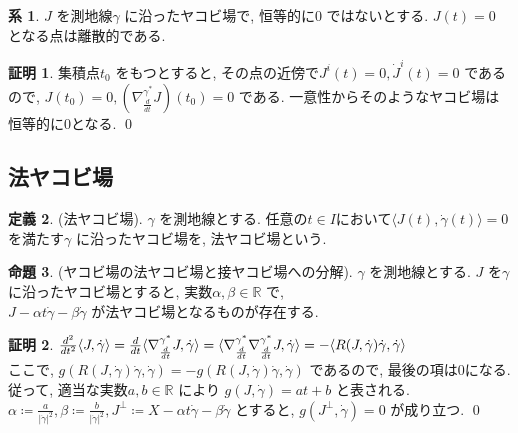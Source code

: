 \documentclass[twocolumn, landscape, a4paper , 8pt, fleqn, titlepage ]{jsarticle}
\theoremstyle{definition}
\newtheorem{dfn}{定義}[section]
\newtheorem{prop}[dfn]{命題}
\newtheorem{cor}[dfn]{系}
\newtheorem*{pf*}{証明}
\newcommand{\tbra}[1]{\mleft\langle#1\mright\rangle}
\newcommand{\ntbra}[1]{\langle#1\rangle}
\newcommand{\abs}[1]{\left|#1\right|}
\renewcommand{\-}{\hyphen}
\begin{document}
\begin{cor}
$J$ を測地線$\gamma$ に沿ったヤコビ場で, 恒等的に$0$ ではないとする. $J(t) = 0$ となる点は離散的である.
\end{cor}
\begin{pf*}
集積点$t_0$ をもつとすると, その点の近傍で$J^i (t) = 0, \dot J ^i (t) = 0$ であるので, $J(t_0) = 0, (\nabla^{\gamma^*} _{\frac{d}{dt} } J ) (t_0) = 0$ である. 一意性からそのようなヤコビ場は恒等的に0となる.
\qed
\end{pf*}



\subsection{法ヤコビ場}
\begin{dfn}(法ヤコビ場).
$\gamma$ を測地線とする.
任意の$t \in I$において$ \ntbra{J(t), \dot \gamma (t)} = 0 $ を満たす$\gamma$ に沿ったヤコビ場を, 法ヤコビ場という.
\end{dfn}

\begin{prop}(ヤコビ場の法ヤコビ場と接ヤコビ場への分解).
$\gamma$ を測地線とする. $J$ を$\gamma$ に沿ったヤコビ場とすると, 実数$\alpha , \beta \in \mathbb R$ で, \\
$J - \alpha t \dot \gamma - \beta \dot \gamma $ が法ヤコビ場となるものが存在する.
\end{prop}
\begin{pf*}
$\frac{d^2}{dt^2} \tbra{J, \dot \gamma } = \frac{d}{dt} \ntbra{\nabla^{\gamma^*} _{\frac{d}{dt} } J, \dot \gamma } = \ntbra{\nabla^{\gamma^*} _{\frac{d}{dt} } \nabla^{\gamma^*} _{\frac{d}{dt} } J, \dot \gamma}  = -\tbra{R(J,\dot \gamma) \dot \gamma, \dot \gamma}  $ \\
ここで, $g(R(J,\dot \gamma)\dot \gamma,\dot \gamma) = - g(R(J,\dot \gamma)\dot \gamma,\dot \gamma) $ であるので, 最後の項は0になる. 従って, 適当な実数$a,b \in \mathbb R$ により $ g(J, \dot \gamma) = at + b $ と表される. \\
$\alpha \coloneqq \frac{a}{\abs{\dot \gamma} ^2} , \beta \coloneqq \frac{b}{\abs{\dot \gamma} ^2}, J^\perp \coloneqq X - \alpha t \dot \gamma - \beta \dot \gamma $ とすると, $g(J^\perp, \dot \gamma) = 0$ が成り立つ.
\qed
\end{pf*}
\end{document}
